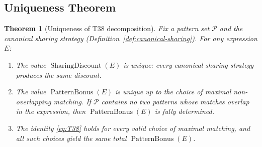 \documentclass[12pt,a4paper]{article}
\newtheorem{theorem}{Theorem}[section]
\theoremstyle{definition}
\newcommand{\SD}{\operatorname{SharingDiscount}}
\newcommand{\PB}{\operatorname{PatternBonus}}
\begin{document}
\subsection{Uniqueness Theorem}

\begin{theorem}[Uniqueness of T38 decomposition]
\label{thm:unique}
Fix a pattern set $\mathcal{P}$ and the canonical sharing strategy
(Definition~\ref{def:canonical-sharing}).  For any expression $E$:
\begin{enumerate}
  \item The value $\SD(E)$ is unique: every canonical sharing strategy produces
        the same discount.
  \item The value $\PB(E)$ is unique up to the choice of maximal non-overlapping
        matching.  If $\mathcal{P}$ contains no two patterns whose matches
        overlap in the expression, then $\PB(E)$ is fully determined.
  \item The identity \eqref{eq:T38} holds for every valid choice of maximal
        matching, and all such choices yield the same total $\PB(E)$.
\end{enumerate}
\end{theorem}
\end{document}
